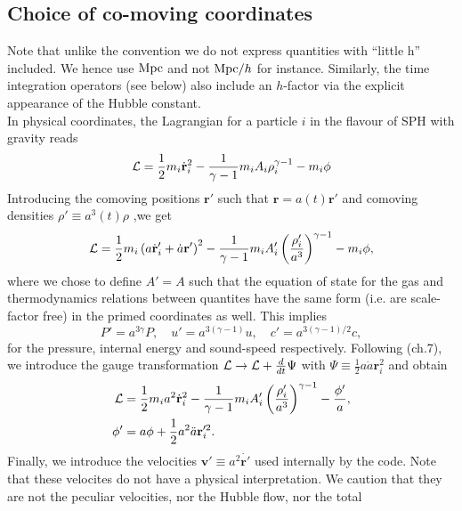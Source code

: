 \subsection{Choice of co-moving coordinates}
\label{ssec:ccordinates}

Note that unlike the \gadget convention we do not express quantities
with ``little h'' included. We hence use $\rm{Mpc}$ and not
${\rm{Mpc}}/h$ for instance. Similarly, the time integration operators
(see below) also include an $h$-factor via the explicit appearance of
the Hubble constant.\\
In physical coordinates, the Lagrangian for a particle $i$ in the
\cite{Springel2002} flavour of SPH with gravity reads
\begin{equation}
  \mathcal{L} =
  \frac{1}{2} m_i \dot{\mathbf{r}}_i^2 -
  \frac{1}{\gamma-1}m_iA_i\rho_i^{\gamma-1} -
  m_i \phi
\end{equation}
Introducing the comoving positions $\mathbf{r}'$ such that $\mathbf{r}
= a(t) \mathbf{r}'$ and comoving densities $\rho' \equiv a^3(t)\rho$ ,we get
\begin{equation}
  \mathcal{L} =
  \frac{1}{2} m_i \left(a\dot{\mathbf{r}}_i' + \dot{a}\mathbf{r}'
  \right)^2 - 
  \frac{1}{\gamma-1}m_iA_i'\left(\frac{\rho_i'}{a^3}\right)^{\gamma-1}
  - m_i \phi,
\end{equation}
where we chose to define $A'=A$ such that the equation of state for
the gas and thermodynamics relations between quantites have the same
form (i.e. are scale-factor free) in the primed coordinates as
well. This implies
\begin{equation}
  P' = a^{3\gamma}P,\quad u'=a^{3(\gamma-1)}u, \quad c'=a^{3(\gamma-1)/2}c,
\end{equation}
for the pressure, internal energy and sound-speed
respectively. Following \cite{Peebles1980} (ch.7), we introduce the
gauge transformation $\mathcal{L} \rightarrow \mathcal{L} + \frac{d}{dt}\Psi$ with
$\Psi \equiv \frac{1}{2}a\dot{a}\mathbf{r}_i^2$ and obtain
\begin{align}
  \mathcal{L} &= \frac{1}{2}m_ia^2 \dot{\mathbf{r}}_i^2 -
  \frac{1}{\gamma-1}m_iA_i'\left(\frac{\rho_i'}{a^3}\right)^{\gamma-1}
  -\frac{\phi'}{a},\\
  \phi' &= a\phi + \frac{1}{2}a^2\ddot{a}\mathbf{r}_i'^2.\nonumber
\end{align}
Finally, we introduce the velocities $\mathbf{v}' \equiv
a^2\dot{\mathbf{r}'}$ used internally by the code. Note that these
velocites do not have a physical interpretation. We caution that they
are not the peculiar velocities, nor the Hubble flow, nor the total
